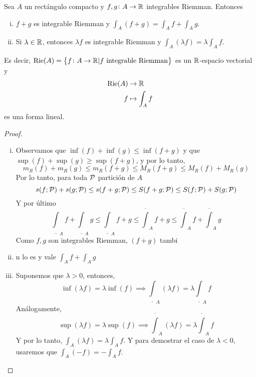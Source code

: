 \begin{prop}[Linealidad]\label{prop:lin_int}
    Sea $A$ un rectángulo compacto y $f,g \colon A \to \mathbb{R}$ integrables Riemman.
    Entonces
    \begin{enumerate}[i)]
        \item $f+g$ es integrable Riemman y $\int_A (f+g) = \int_A f+\int_A g$.
        \item Si $\lambda \in \mathbb{R}$, entonces $\lambda f$ es integrable
            Riemman y $\int_A (\lambda f) = \lambda \int_A f$.
    \end{enumerate}

    Es decir, $\text{Rie}(A) = \left\{f \colon A \to \mathbb{R} \vert f \text{ integrable
    Riemman}\right\}$ es un $\mathbb{R}$-espacio vectorial y 
    \[
        \begin{aligned}
            \text{Rie}(A) &\to \mathbb{R} \\ f &\mapsto \int_A f
        \end{aligned}
    \]
    es una forma lineal.
\end{prop}
\begin{proof}
    \begin{enumerate}[i)]
        \item Observamos que $\inf(f) + \inf(g) \leq \inf(f+g)$ y que
            $\sup(f)+\sup(g) \geq \sup(f+g)$, y por lo tanto,
            \[
                m_R(f) + m_R(g) \leq m_R(f+g) \leq M_R(f+g) \leq
                M_R(f) + M_R(g)
            \]
            Por lo tanto, para toda $\mathcal{P}$ partición de $A$
            \[
                s(f;\mathcal{P}) + s(g;\mathcal{P}) \leq s(f+g;\mathcal{P}) \leq S(f+g;\mathcal{P})
                \leq S(f;\mathcal{P}) + S(g;\mathcal{P})
            \]
            Y por último
            \[
                \underline{\int}_A f + \underline{\int}_A g \leq
                \underline{\int}_A f+g \leq \overline{\int}_A f+g \leq
                \overline{\int}_A f + \overline{\int}_A g
            \]
            Como $f,g$ son integrables Riemman, $(f+g)$ tambi\item n lo es
            y vale $\int_A f + \int_A g$
        \item Suponemos que $\lambda > 0$, entonces,
            \[
                \inf (\lambda f) = \lambda \inf (f) \implies
                \underline{\int}_A (\lambda f) = \lambda
                \underline{\int}_A f
            \]
            Análogamente,
            \[
                \sup(\lambda f) = \lambda \sup(f) \implies
                \overline{\int}_A (\lambda f) = \lambda
                \overline{\int}_A f
            \]
            Y por lo tanto, $\int_A (\lambda f) = \lambda \int_A f$.
            Y para demostrar el caso de $\lambda < 0$, usaremos que
            $\int_A (-f) = - \int_A f$.
    \end{enumerate}
\end{proof}

